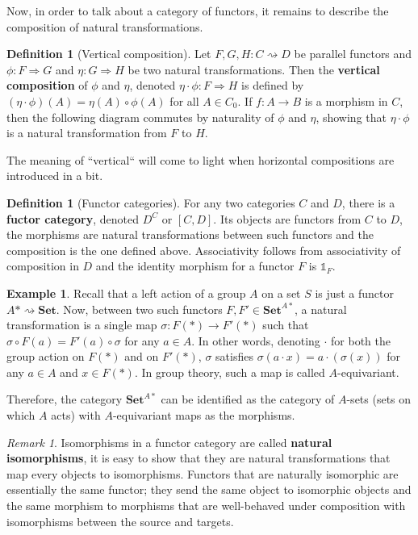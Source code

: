 \documentclass{article}
\theoremstyle{definition}
\newtheorem{defn}[thm]{Definition}
\newtheorem{exmp}[thm]{Example}
\theoremstyle{remark}
\newtheorem{rem}[thm]{Remark}
\newcommand{\one}{\mathbb{1}}
\begin{document}
Now, in order to talk about a category of functors, it remains to describe the composition of natural transformations.
\begin{defn}[Vertical composition]
	Let $F,G,H: C\rightsquigarrow D$ be parallel functors and $\phi:F\Rightarrow G$ and $\eta:G\Rightarrow H$ be two natural transformations. Then the \textbf{vertical composition} of $\phi$ and $\eta$, denoted $\eta\cdot \phi:F\Rightarrow H$ is defined by $(\eta \cdot \phi)(A) = \eta(A) \circ \phi(A)$ for all $A \in C_0$. If $f: A\rightarrow B$ is a morphism in $C$, then the following diagram commutes by naturality of $\phi$ and $\eta$, showing that $\eta \cdot \phi$ is a natural transformation from $F$ to $H$.
	\begin{figure}[h]
		\centering
	\end{figure}
	
	 The meaning of ``vertical`` will come to light when horizontal compositions are introduced in a bit.
\end{defn}
\begin{defn}[Functor categories]
	For any two categories $C$ and $D$, there is a \textbf{fuctor category}, denoted $D^{C}$ or $[C,D]$. Its objects are functors from $C$ to $D$, the morphisms are natural transformations between such functors and the composition is the one defined above. Associativity follows from associativity of composition in $D$ and the identity morphism for a functor $F$ is $\one_F$.
\end{defn}
\begin{exmp}
	Recall that a left action of a group $A$ on a set $S$ is just a functor $A\ast \rightsquigarrow \textbf{Set}$. Now, between two such functors $F,F' \in \textbf{Set}^{A\ast}$, a natural transformation is a single map $\sigma: F(\ast) \rightarrow F'(\ast)$ such that $\sigma \circ F(a) = F'(a) \circ \sigma$ for any $a \in A$. In other words, denoting $\cdot$ for both the group action on $F(\ast)$ and on $F'(\ast)$, $\sigma$ satisfies $\sigma(a\cdot x) = a\cdot(\sigma(x))$ for any $a \in A$ and $x \in F(\ast)$. In group theory, such a map is called $A$-equivariant.
	
	Therefore, the category $\textbf{Set}^{A\ast}$ can be identified as the category of $A$-sets (sets on which $A$ acts) with $A$-equivariant maps as the morphisms.
\end{exmp}
\begin{rem}
	Isomorphisms in a functor category are called \textbf{natural isomorphisms}, it is easy to show that they are natural transformations that map every objects to isomorphisms. Functors that are naturally isomorphic are essentially the same functor; they send the same object to isomorphic objects and the same morphism to morphisms that are well-behaved under composition with isomorphisms between the source and targets.
\end{rem}
\end{document}
